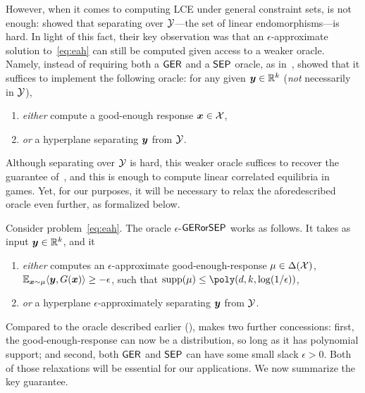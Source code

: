 However, when it comes to computing LCE under general constraint sets,  is not enough: \citet{Daskalakis24:Efficient} showed that separating over ${\mathcal{Y}}$---the set of linear endomorphisms---is hard. In light of this fact, their key observation was that an $\epsilon$-approximate solution to~\eqref{eq:eah} can still be computed given access to a weaker oracle. Namely, instead of requiring both a $\textsf{GER}$ and a $\textsf{SEP}$ oracle, as in~, \citet{Daskalakis24:Efficient} showed that it suffices to implement the following oracle: for any given ${\bm{y}} \in \mathbb R^k$ (\emph{not} necessarily in ${\mathcal{Y}}$), 
\begin{enumerate}
    \item \emph{either} compute a good-enough response ${\bm{x}} \in {\mathcal{X}}$,\label{item:ger}
    \item \emph{or} a hyperplane separating ${\bm{y}}$ from ${\mathcal{Y}}$.\label{item:sep}
\end{enumerate}
Although separating over ${\mathcal{Y}}$ is hard, this weaker oracle suffices to recover the guarantee of~, and this is enough to compute linear correlated equilibria in games. Yet, for our purposes, it will be necessary to relax the aforedescribed oracle even further, as formalized below.

\begin{definition}[$\either$]
    \label{def:either}
    Consider problem~\eqref{eq:eah}. The oracle $\epsilon$-$\either$ works as follows. It takes as input ${\bm{y}} \in \mathbb R^k$, and it 
    \begin{enumerate}
        \item \emph{either} computes an $\epsilon$-approximate good-enough-response $\mu \in \Delta({\mathcal{X}})$, $\operatorname*{\mathbb E}_{{\bm{x}} \sim \mu} \langle {\bm{y}}, G({\bm{x}}) \rangle \geq - \epsilon$, such that $\supp(\mu) \leq \poly(d, k, \log(1/\epsilon))$,
        \item \emph{or} a hyperplane $\epsilon$-approximately separating ${\bm{y}}$ from ${\mathcal{Y}}$.
    \end{enumerate}
\end{definition}

Compared to the oracle described earlier (),  makes two further concessions: first, the good-enough-response can now be a distribution, so long as it has polynomial support; and second, both $\textsf{GER}$ and $\textsf{SEP}$ can have some small slack $\epsilon > 0$. Both of those relaxations will be essential for our applications. We now summarize the key guarantee.

